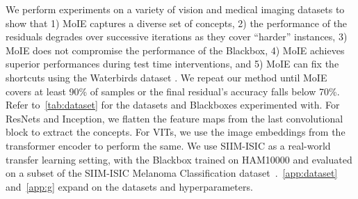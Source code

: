 
We perform experiments on a variety of vision and medical imaging datasets to show that 1) MoIE captures a diverse set of concepts, 2) the performance of the residuals degrades over successive iterations as they cover ``harder'' instances, 3) MoIE does not compromise the performance of the Blackbox, 4) MoIE achieves superior performances during test time interventions, and 5) MoIE can fix the shortcuts using the Waterbirds dataset \cite{sagawa2019dro}. We repeat our method until MoIE covers at least 90\% of samples or the final residual's accuracy falls below 70\%. Refer to~\cref{tab:dataset} for the datasets and Blackboxes experimented with. For ResNets and Inception, we flatten the feature maps from the last convolutional block to extract the concepts. For VITs, we use the image embeddings from the transformer encoder to perform the same. We use SIIM-ISIC as a real-world transfer learning setting, with the Blackbox trained on HAM10000 and evaluated on a subset of the SIIM-ISIC Melanoma Classification dataset~\cite{yuksekgonul2022post}.~\cref{app:dataset} and~\cref{app:g} expand on the datasets and hyperparameters.

